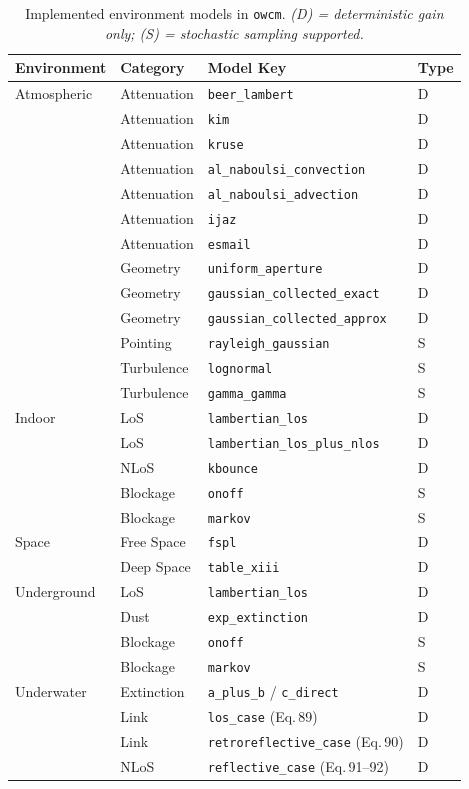 \documentclass[11pt,a4paper]{article}
\begin{document}
\begin{table}[H]
\centering
\caption{Implemented environment models in \texttt{owcm}.
\emph{(D) = deterministic gain only; (S) = stochastic sampling supported.}}
\label{tab:summary}
\footnotesize
\begin{tabular}{@{}llll@{}}
\toprule
\textbf{Environment} & \textbf{Category} & \textbf{Model Key} & \textbf{Type} \\
\midrule
Atmospheric & Attenuation & \texttt{beer\_lambert} & D \\
            & Attenuation & \texttt{kim} & D \\
            & Attenuation & \texttt{kruse} & D \\
            & Attenuation & \texttt{al\_naboulsi\_convection} & D \\
            & Attenuation & \texttt{al\_naboulsi\_advection} & D \\
            & Attenuation & \texttt{ijaz} & D \\
            & Attenuation & \texttt{esmail} & D \\
            & Geometry    & \texttt{uniform\_aperture} & D \\
            & Geometry    & \texttt{gaussian\_collected\_exact} & D \\
            & Geometry    & \texttt{gaussian\_collected\_approx} & D \\
            & Pointing    & \texttt{rayleigh\_gaussian} & S \\
            & Turbulence  & \texttt{lognormal} & S \\
            & Turbulence  & \texttt{gamma\_gamma} & S \\
\midrule
Indoor      & LoS       & \texttt{lambertian\_los} & D \\
            & LoS       & \texttt{lambertian\_los\_plus\_nlos} & D \\
            & NLoS      & \texttt{kbounce} & D \\
            & Blockage  & \texttt{onoff} & S \\
            & Blockage  & \texttt{markov} & S \\
\midrule
Space       & Free Space  & \texttt{fspl} & D \\
            & Deep Space  & \texttt{table\_xiii} & D \\
\midrule
Underground & LoS       & \texttt{lambertian\_los} & D \\
            & Dust      & \texttt{exp\_extinction} & D \\
            & Blockage  & \texttt{onoff} & S \\
            & Blockage  & \texttt{markov} & S \\
\midrule
Underwater  & Extinction & \texttt{a\_plus\_b} / \texttt{c\_direct} & D \\
            & Link       & \texttt{los\_case} (Eq.\,89) & D \\
            & Link       & \texttt{retroreflective\_case} (Eq.\,90) & D \\
            & NLoS       & \texttt{reflective\_case} (Eq.\,91--92) & D \\
\bottomrule
\end{tabular}
\end{table}
\end{document}
